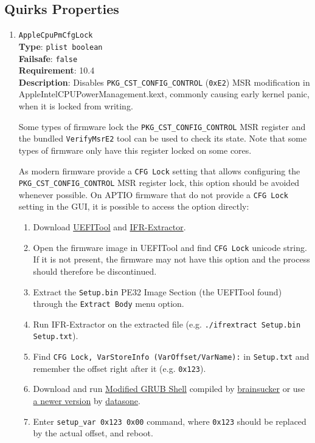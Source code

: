 \documentclass[]{article}
\makeatletter
\providecommand{\tightlist}{%
  \setlength{\itemsep}{0pt}\setlength{\parskip}{0pt}}
\renewcommand{\label}[1]{%
\zref@wrapper@immediate{\oldlabel{#1}}}  %
\makeatother
\begin{document}
\subsection{Quirks Properties}\label{kernelpropsquirks}

\begin{enumerate}

\item
  \texttt{AppleCpuPmCfgLock}\\
  \textbf{Type}: \texttt{plist\ boolean}\\
  \textbf{Failsafe}: \texttt{false}\\
  \textbf{Requirement}: 10.4\\
  \textbf{Description}: Disables \texttt{PKG\_CST\_CONFIG\_CONTROL} (\texttt{0xE2})
  MSR modification in AppleIntelCPUPowerManagement.kext, commonly causing early
  kernel panic, when it is locked from writing.

  Some types of firmware lock the \texttt{PKG\_CST\_CONFIG\_CONTROL} MSR register and the bundled
  \texttt{VerifyMsrE2} tool can be used to check its state. Note that some types of firmware only
  have this register locked on some cores.

  As modern firmware provide a \texttt{CFG Lock} setting that allows configuring the
  \texttt{PKG\_CST\_CONFIG\_CONTROL} MSR register lock, this option should be avoided
  whenever possible. On APTIO firmware that do not provide a \texttt{CFG Lock}
  setting in the GUI, it is possible to access the option directly:

  \begin{enumerate}
    \tightlist
    \item Download \href{https://github.com/LongSoft/UEFITool/releases}{UEFITool} and
      \href{https://github.com/LongSoft/Universal-IFR-Extractor/releases}{IFR-Extractor}.
    \item Open the firmware image in UEFITool and find \texttt{CFG Lock} unicode string.
      If it is not present, the firmware may not have this option and the process should therefore be discontinued.
    \item Extract the \texttt{Setup.bin} PE32 Image Section (the UEFITool found) through the
      \texttt{Extract Body} menu option.
    \item Run IFR-Extractor on the extracted file (e.g. \texttt{./ifrextract Setup.bin Setup.txt}).
    \item Find \texttt{CFG Lock, VarStoreInfo (VarOffset/VarName):} in \texttt{Setup.txt} and
      remember the offset right after it (e.g. \texttt{0x123}).
    \item Download and run \href{http://brains.by/posts/bootx64.7z}{Modified GRUB Shell} compiled by
      \href{https://geektimes.com/post/258090}{brainsucker} or use
      \href{https://github.com/datasone/grub-mod-setup_var}{a newer version} by
      \href{https://github.com/datasone}{datasone}.
    \item Enter \texttt{setup\_var 0x123 0x00} command, where \texttt{0x123} should be replaced by
      the actual offset, and reboot.
  \end{enumerate}


\end{enumerate}
\end{document}
